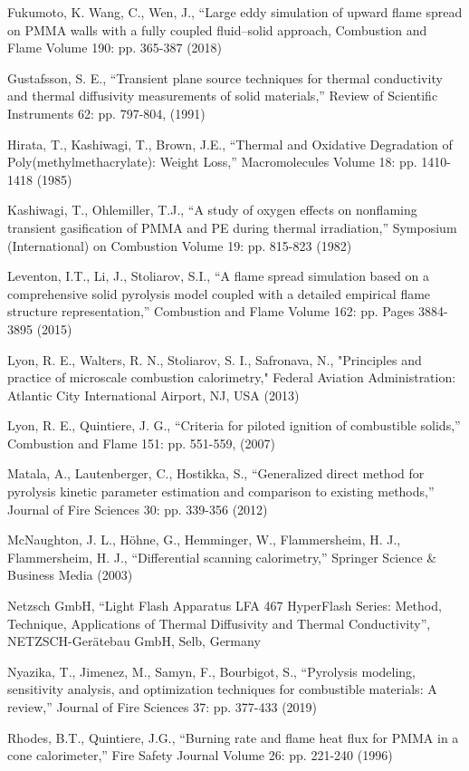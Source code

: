 \documentclass{book}
\begin{document}
Fukumoto, K. Wang, C., Wen, J., “Large eddy simulation of upward flame spread on PMMA walls with a fully coupled fluid–solid approach, Combustion and Flame Volume 190: pp. 365-387 (2018)

Gustafsson, S. E., “Transient plane source techniques for thermal conductivity and thermal diffusivity measurements of solid materials,” Review of Scientific Instruments 62: pp. 797-804, (1991)

Hirata, T., Kashiwagi, T., Brown, J.E., “Thermal and Oxidative Degradation of Poly(methylmethacrylate): Weight Loss,” Macromolecules Volume 18: pp. 1410-1418 (1985)

Kashiwagi, T., Ohlemiller, T.J., “A study of oxygen effects on nonflaming transient gasification of PMMA and PE during thermal irradiation,” Symposium (International) on Combustion Volume 19: pp. 815-823 (1982)

Leventon, I.T., Li, J., Stoliarov, S.I., “A flame spread simulation based on a comprehensive solid pyrolysis model coupled with a detailed empirical flame structure representation,” Combustion and Flame Volume 162: pp. Pages 3884-3895 (2015)

Lyon, R. E., Walters, R. N., Stoliarov, S. I., Safronava, N., "Principles and practice of microscale combustion calorimetry," Federal Aviation Administration: Atlantic City International Airport, NJ, USA (2013)

Lyon, R. E., Quintiere, J. G., “Criteria for piloted ignition of combustible solids,” Combustion and Flame 151: pp. 551-559, (2007)

Matala, A., Lautenberger, C., Hostikka, S., “Generalized direct method for pyrolysis kinetic parameter estimation and comparison to existing methods,” Journal of Fire Sciences 30: pp. 339-356 (2012)

McNaughton, J. L., Höhne, G., Hemminger, W., Flammersheim, H. J., Flammersheim, H. J., “Differential scanning calorimetry,” Springer Science \& Business Media (2003)

Netzsch GmbH, “Light Flash Apparatus LFA 467 HyperFlash Series: Method, Technique, Applications of Thermal Diffusivity and Thermal Conductivity”, NETZSCH-Gerätebau GmbH, Selb, Germany

Nyazika, T., Jimenez, M., Samyn, F., Bourbigot, S., “Pyrolysis modeling, sensitivity analysis, and optimization techniques for combustible materials: A review,” Journal of Fire Sciences 37: pp. 377-433 (2019)

Rhodes, B.T., Quintiere, J.G., “Burning rate and flame heat flux for PMMA in a cone calorimeter,” Fire Safety Journal Volume 26: pp. 221-240 (1996)
\end{document}
